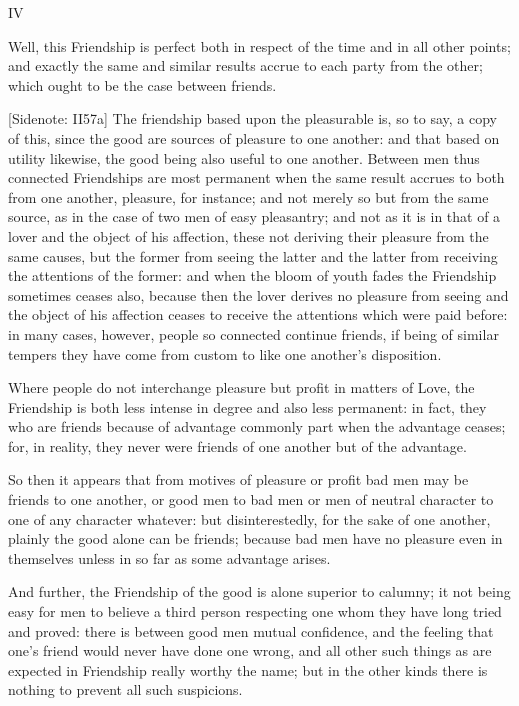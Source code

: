 IV

Well, this Friendship is perfect both in respect of the time and in all
other points; and exactly the same and similar results accrue to each
party from the other; which ought to be the case between friends.

[Sidenote: II57a] The friendship based upon the pleasurable is, so to
say, a copy of this, since the good are sources of pleasure to one
another: and that based on utility likewise, the good being also
useful to one another. Between men thus connected Friendships are
most permanent when the same result accrues to both from one another,
pleasure, for instance; and not merely so but from the same source, as
in the case of two men of easy pleasantry; and not as it is in that of a
lover and the object of his affection, these not deriving their pleasure
from the same causes, but the former from seeing the latter and the
latter from receiving the attentions of the former: and when the bloom
of youth fades the Friendship sometimes ceases also, because then the
lover derives no pleasure from seeing and the object of his affection
ceases to receive the attentions which were paid before: in many cases,
however, people so connected continue friends, if being of similar
tempers they have come from custom to like one another's disposition.

Where people do not interchange pleasure but profit in matters of Love,
the Friendship is both less intense in degree and also less permanent:
in fact, they who are friends because of advantage commonly part when
the advantage ceases; for, in reality, they never were friends of one
another but of the advantage.

So then it appears that from motives of pleasure or profit bad men may
be friends to one another, or good men to bad men or men of neutral
character to one of any character whatever: but disinterestedly, for the
sake of one another, plainly the good alone can be friends; because
bad men have no pleasure even in themselves unless in so far as some
advantage arises.

And further, the Friendship of the good is alone superior to calumny;
it not being easy for men to believe a third person respecting one
whom they have long tried and proved: there is between good men mutual
confidence, and the feeling that one's friend would never have done one
wrong, and all other such things as are expected in Friendship really
worthy the name; but in the other kinds there is nothing to prevent all
such suspicions.

